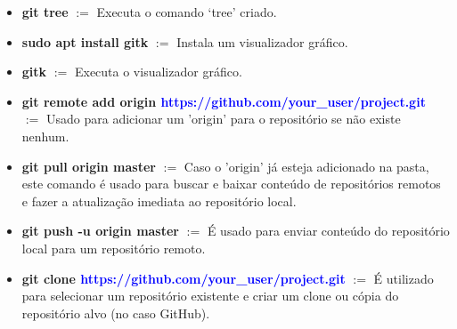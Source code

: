 \documentclass[12pt]{article}
\begin{document}
\begin{itemize}
	\item \textbf{git tree} $:=$ Executa o comando `tree' criado.
	
	\item \textbf{sudo apt install gitk} $:=$ Instala um visualizador gráfico.
	
	\item \textbf{gitk} $:=$ Executa o visualizador gráfico.
	
	\item \textbf{git remote add origin \textcolor{blue}{https://github.com/your\_user/project.git}} $:=$ Usado para adicionar um 'origin' para o repositório se não existe nenhum.
	
	\item \textbf{git pull origin master} $:=$ Caso o 'origin' já esteja adicionado na pasta, este comando é usado para buscar e baixar conteúdo de repositórios remotos e fazer a atualização imediata ao repositório local.
	
	\item \textbf{git push -u origin master} $:=$ É usado para enviar conteúdo do repositório local para um repositório remoto.
	
	\item \textbf{git clone \textcolor{blue}{https://github.com/your\_user/project.git}} $:=$ É utilizado para selecionar um repositório existente e criar um clone ou cópia do repositório alvo (no caso GitHub).
	
\end{itemize}



\end{document}
